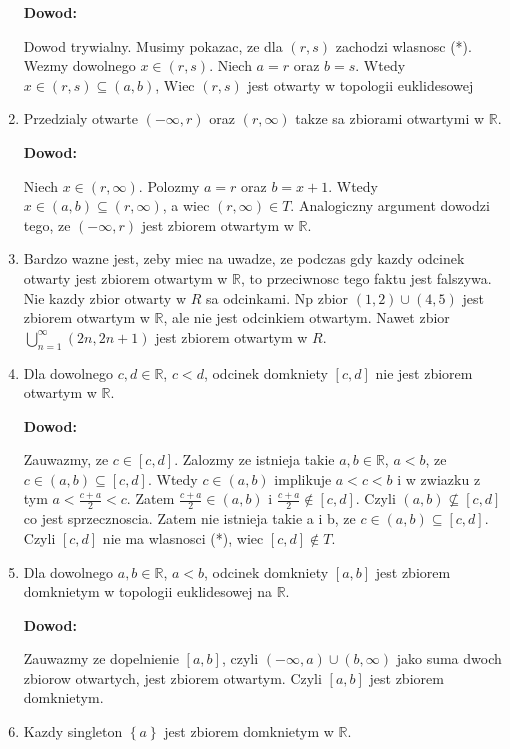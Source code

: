 \documentclass{article}
\begin{document}
\begin{enumerate}[label=(\alph*)]
        \textbf{Dowod:}

        Dowod trywialny. Musimy pokazac, ze dla $(r,s)$ zachodzi wlasnosc (*). Wezmy dowolnego $x \in (r,s)$. Niech $a=r$ oraz $b=s$. Wtedy $x \in (r,s) \subseteq (a,b)$, Wiec $(r,s)$ jest otwarty w topologii euklidesowej
    \item Przedzialy otwarte $(-\infty, r)$ oraz $(r, \infty)$ takze sa zbiorami otwartymi w $\mathbb{R}$.

        \textbf{Dowod:}

        Niech $x \in (r,\infty)$. Polozmy $a = r$ oraz $b = x+1$. Wtedy $x \in (a,b) \subseteq (r, \infty)$, a wiec $(r, \infty) \in T$. Analogiczny argument dowodzi tego, ze $(-\infty, r)$ jest zbiorem otwartym w $\mathbb{R}$.
    \item Bardzo wazne jest, zeby miec na uwadze, ze podczas gdy kazdy odcinek otwarty jest zbiorem otwartym w $\mathbb{R}$, to przeciwnosc tego faktu jest falszywa. Nie kazdy zbior otwarty w $R$ sa odcinkami. Np zbior $(1,2) \cup (4, 5)$ jest zbiorem otwartym w $\mathbb{R}$, ale nie jest odcinkiem otwartym. Nawet zbior $\bigcup\limits_{n=1}^{\infty}(2n, 2n+1)$ jest zbiorem otwartym w $R$.

    \item Dla dowolnego $c,d \in \mathbb{R}$, $c<d$, odcinek domkniety $[c,d]$ nie jest zbiorem otwartym w $\mathbb{R}$.

        \textbf{Dowod:}

        Zauwazmy, ze $c \in [c,d]$. Zalozmy ze istnieja takie $a,b \in \mathbb{R}$, $a<b$, ze $c \in (a,b) \subseteq [c,d]$. Wtedy $c \in (a,b)$ implikuje $a < c < b$ i w zwiazku z tym $a < \frac{c+a}{2} < c$. Zatem $  \frac{c+a}{2} \in (a,b)$ i $ \frac{c+a}{2} \notin [c,d]$. Czyli $(a,b) \not\subseteq [c,d]$ co jest sprzecznoscia. Zatem nie istnieja takie a i b, ze $c \in (a,b) \subseteq [c,d]$. Czyli $[c,d]$ nie ma wlasnosci (*), wiec $[c,d] \notin T$.
    \item  Dla dowolnego $a,b \in \mathbb{R}$, $a<b$, odcinek domkniety $[a,b]$ jest zbiorem domknietym w topologii euklidesowej na $\mathbb{R}$.

        \textbf{Dowod:}

        Zauwazmy ze dopelnienie $[a,b]$, czyli $(-\infty, a) \cup (b, \infty)$ jako suma dwoch zbiorow otwartych, jest zbiorem otwartym. Czyli $[a,b]$ jest zbiorem domknietym.

    \item Kazdy singleton $\left\{ a \right\}$ jest zbiorem domknietym w $\mathbb{R}$.


\end{enumerate}
\end{document}
